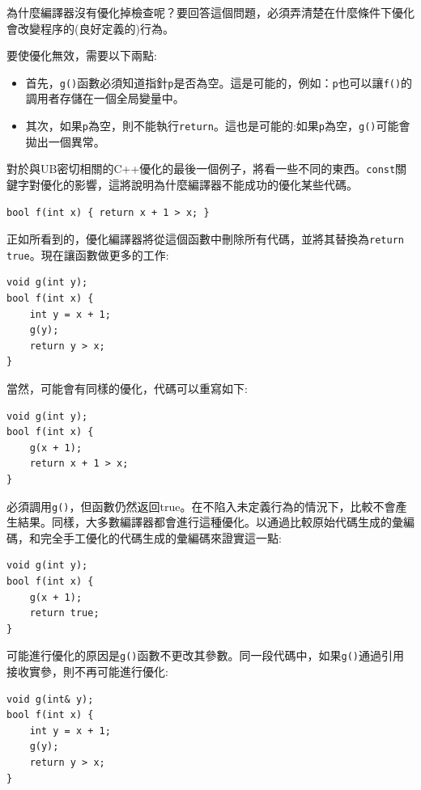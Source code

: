 為什麼編譯器沒有優化掉檢查呢？要回答這個問題，必須弄清楚在什麼條件下優化會改變程序的(良好定義的)行為。

要使優化無效，需要以下兩點:

\begin{itemize}
\item 
首先，\texttt{g()}函數必須知道指針\texttt{p}是否為空。這是可能的，例如：\texttt{p}也可以讓\texttt{f()}的調用者存儲在一個全局變量中。

\item 
其次，如果\texttt{p}為空，則不能執行\texttt{return}。這也是可能的:如果\texttt{p}為空，\texttt{g()}可能會拋出一個異常。
\end{itemize}

對於與UB密切相關的C++優化的最後一個例子，將看一些不同的東西。\texttt{const}關鍵字對優化的影響，這將說明為什麼編譯器不能成功的優化某些代碼。

\begin{lstlisting}[style=styleCXX]
bool f(int x) { return x + 1 > x; }
\end{lstlisting}

正如所看到的，優化編譯器將從這個函數中刪除所有代碼，並將其替換為\texttt{return true}。現在讓函數做更多的工作:

\begin{lstlisting}[style=styleCXX]
void g(int y);
bool f(int x) {
	int y = x + 1;
	g(y);
	return y > x;
}
\end{lstlisting}

當然，可能會有同樣的優化，代碼可以重寫如下:

\begin{lstlisting}[style=styleCXX]
void g(int y);
bool f(int x) {
	g(x + 1);
	return x + 1 > x;
}
\end{lstlisting}

必須調用\texttt{g()}，但函數仍然返回true。在不陷入未定義行為的情況下，比較不會產生結果。同樣，大多數編譯器都會進行這種優化。以通過比較原始代碼生成的彙編碼，和完全手工優化的代碼生成的彙編碼來證實這一點:

\begin{lstlisting}[style=styleCXX]
void g(int y);
bool f(int x) {
	g(x + 1);
	return true;
}
\end{lstlisting}

可能進行優化的原因是\texttt{g()}函數不更改其參數。同一段代碼中，如果\texttt{g()}通過引用接收實參，則不再可能進行優化:

\begin{lstlisting}[style=styleCXX]
void g(int& y);
bool f(int x) {
	int y = x + 1;
	g(y);
	return y > x;
}
\end{lstlisting}

